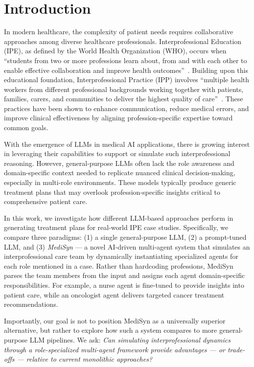 \documentclass[pdflatex,sn-mathphys-num]{sn-jnl}%
\theoremstyle{thmstyleone}%
\theoremstyle{thmstyletwo}%
\theoremstyle{thmstylethree}%
\begin{document}
\section{Introduction}\label{sec1}

In modern healthcare, the complexity of patient needs requires collaborative approaches among diverse healthcare professionals. Interprofessional Education (IPE), as defined by the World Health Organization (WHO), occurs when ``students from two or more professions learn about, from and with each other to enable effective collaboration and improve health outcomes''~\cite{WHO2010}. Building upon this educational foundation, Interprofessional Practice (IPP) involves ``multiple health workers from different professional backgrounds working together with patients, families, carers, and communities to deliver the highest quality of care''~\cite{WHO2010}. These practices have been shown to enhance communication, reduce medical errors, and improve clinical effectiveness by aligning profession-specific expertise toward common goals.


With the emergence of LLMs in medical AI applications, there is growing interest in leveraging their capabilities to support or simulate such interprofessional reasoning. However, general-purpose LLMs often lack the role awareness and domain-specific context needed to replicate nuanced clinical decision-making, especially in multi-role environments. These models typically produce generic treatment plans that may overlook profession-specific insights critical to comprehensive patient care.

In this work, we investigate how different LLM-based approaches perform in generating treatment plans for real-world IPE case studies. Specifically, we compare three paradigms: (1) a single general-purpose LLM, (2) a prompt-tuned LLM, and (3) \textit{MediSyn} — a novel AI-driven multi-agent system that simulates an interprofessional care team by dynamically instantiating specialized agents for each role mentioned in a case. Rather than hardcoding professions, MediSyn parses the team members from the input and assigns each agent domain-specific responsibilities. For example, a nurse agent is fine-tuned to provide insights into patient care, while an oncologist agent delivers targeted cancer treatment recommendations.

Importantly, our goal is not to position MediSyn as a universally superior alternative, but rather to explore how such a system compares to more general-purpose LLM pipelines. We ask: \textit{Can simulating interprofessional dynamics through a role-specialized multi-agent framework provide advantages — or trade-offs — relative to current monolithic approaches?}
\end{document}
